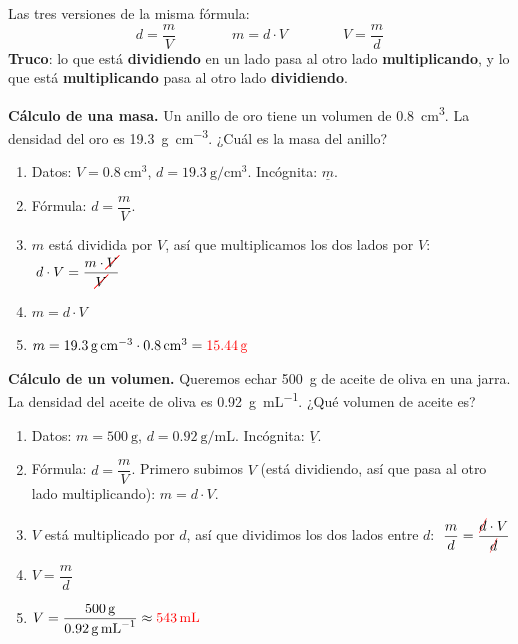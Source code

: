 \begin{impt}
    Las tres versiones de la misma fórmula:
    \begin{equation*}
        d = \dfrac{m}{V} \qquad\qquad m = d \cdot V \qquad\qquad V = \dfrac{m}{d}
    \end{equation*}
    \textbf{Truco}: lo que está \textbf{dividiendo} en un lado pasa al otro lado \textbf{multiplicando}, y lo que está \textbf{multiplicando} pasa al otro lado \textbf{dividiendo}.
\end{impt}

\begin{example}
    \textbf{Cálculo de una masa.} Un anillo de oro tiene un volumen de \qty{0.8}{\cubic\cm}. La densidad del oro es \qty{19.3}{\g\per\cubic\cm}. ¿Cuál es la masa del anillo?
    \begin{enumerate}[label=\numberballmDarkTeal]
        \item Datos: \(V = \qty{0.8}{\cubic\cm}\), \(d = \qty{19.3}{\g\per\cubic\cm}\). Incógnita: \(\underline{m}\).
        \item Fórmula: \(d = \dfrac{m}{V}\).
        \item \(m\) está dividida por \(V\), así que multiplicamos los dos lados por \(V\):
        \(\;d \cdot V = \dfrac{m \cdot \cancelred{V}}{\cancelred{V}}\)
        \item \(m = d \cdot V\)
        \item \(m = \qty{19.3}{\g\per\cubic\cm} \cdot \qty{0.8}{\cubic\cm} = \textcolor{red}{\qty{15.44}{\g}}\)
    \end{enumerate}
\end{example}

\begin{example}
    \textbf{Cálculo de un volumen.} Queremos echar \qty{500}{\g} de aceite de oliva en una jarra. La densidad del aceite de oliva es \qty{0.92}{\g\per\mL}. ¿Qué volumen de aceite es?
    \begin{enumerate}[label=\numberballmDarkTeal]
        \item Datos: \(m = \qty{500}{\g}\), \(d = \qty{0.92}{\g\per\mL}\). Incógnita: \(\underline{V}\).
        \item Fórmula: \(d = \dfrac{m}{V}\). Primero subimos \(V\) (está dividiendo, así que pasa al otro lado multiplicando): \(m = d \cdot V\).
        \item \(V\) está multiplicado por \(d\), así que dividimos los dos lados entre \(d\):
        \(\;\dfrac{m}{d} = \dfrac{\cancelred{d} \cdot V}{\cancelred{d}}\)
        \item \(V = \dfrac{m}{d}\)
        \item \(V = \dfrac{\qty{500}{\g}}{\qty{0.92}{\g\per\mL}} \approx \textcolor{red}{\qty{543}{\mL}}\)
    \end{enumerate}
\end{example}

